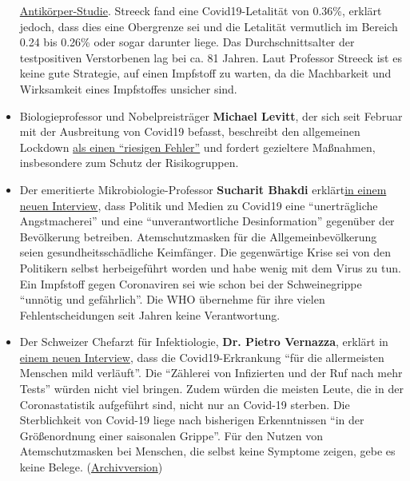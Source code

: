 \begin{itemize}
  \href{https://medicalxpress.com/news/2020-05-team-covid-infection-fatality.html}{Antikörper-Studie}.
  Streeck fand eine Covid19-Letalität von 0.36\%, erklärt jedoch, dass
  dies eine Obergrenze sei und die Letalität vermutlich im Bereich 0.24
  bis 0.26\% oder sogar darunter liege. Das Durchschnittsalter der
  testpositiven Verstorbenen lag bei ca. 81 Jahren. Laut Professor
  Streeck ist es keine gute Strategie, auf einen Impfstoff zu warten, da
  die Machbarkeit und Wirksamkeit eines Impfstoffes unsicher sind.
\item
  Biologieprofessor und Nobelpreisträger \textbf{Michael Levitt}, der
  sich seit Februar mit der Ausbreitung von Covid19 befasst, beschreibt
  den allgemeinen Lockdown
  \href{https://www.youtube.com/watch?v=bl-sZdfLcEk}{als einen
  ``riesigen Fehler''} und fordert gezieltere Maßnahmen, insbesondere
  zum Schutz der Risikogruppen.
\item
  Der emeritierte Mikrobiologie-Professor \textbf{Sucharit Bhakdi}
  erklärt\href{https://www.servustv.com/videos/aa-23ud73pbh1w12/}{in
  einem neuen Interview}, dass Politik und Medien zu Covid19 eine
  ``unerträgliche Angstmacherei'' und eine ``unverantwortliche
  Desinformation'' gegenüber der Bevölkerung betreiben. Atemschutzmasken
  für die Allgemein­bevölkerung seien gesund­heits­schädliche
  Keimfänger. Die gegenwärtige Krise sei von den Politikern selbst
  herbeigeführt worden und habe wenig mit dem Virus zu tun. Ein
  Impfstoff gegen Coronaviren sei wie schon bei der Schweinegrippe
  ``unnötig und gefährlich''. Die WHO übernehme für ihre vielen
  Fehlentscheidungen seit Jahren keine Verantwortung.
\item
  Der Schweizer Chefarzt für Infektiologie, \textbf{Dr. Pietro
  Vernazza}, erklärt in
  \href{https://www.saldo.ch/artikel/artikeldetail/fuer-die-allermeisten-menschen-verlaeuft-die-erkrankung-mild/}{einem
  neuen Interview}, dass die Covid19-Erkrankung ``für die allermeisten
  Menschen mild verläuft''. Die ``Zählerei von Infizierten und der Ruf
  nach mehr Tests'' würden nicht viel bringen. Zudem würden die meisten
  Leute, die in der Corona­statistik aufgeführt sind, nicht nur an
  Covid-19 sterben. Die Sterblichkeit von Covid-19 liege nach bisherigen
  Erkenntnissen ``in der Größenordnung einer saisonalen Grippe''. Für
  den Nutzen von Atemschutzmasken bei Menschen, die selbst keine
  Symptome zeigen, gebe es keine Belege.
  (\href{https://swprs.files.wordpress.com/2020/05/saldo-interview-pietro-vernazza-14-04-2020.pdf}{Archivversion})
\end{itemize}

